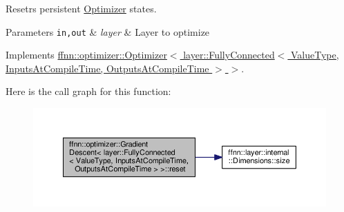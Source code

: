 Resetrs persistent \hyperlink{classffnn_1_1optimizer_1_1_optimizer}{Optimizer} states. 


\begin{DoxyParams}[1]{Parameters}
\mbox{\tt in,out}  & {\em layer} & Layer to optimize \\
\hline
\end{DoxyParams}


Implements \hyperlink{classffnn_1_1optimizer_1_1_optimizer_ade04e7582eb7b833713a9bd33e0e8346}{ffnn\-::optimizer\-::\-Optimizer$<$ layer\-::\-Fully\-Connected$<$ Value\-Type, Inputs\-At\-Compile\-Time, Outputs\-At\-Compile\-Time $>$ $>$}.



Here is the call graph for this function\-:
\nopagebreak
\begin{figure}[H]
\begin{center}
\leavevmode
\includegraphics[width=350pt]{classffnn_1_1optimizer_1_1_gradient_descent_3_01layer_1_1_fully_connected_3_01_value_type_00_01_5f7b01db2ae4d39760d70ee323649a60_a8317088f22bb86f204108a82f9233844_cgraph}
\end{center}
\end{figure}


